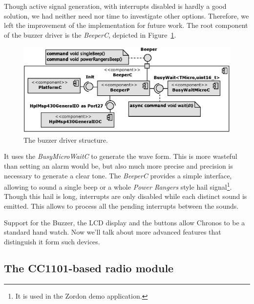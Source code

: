 Though active signal generation, with interrupts disabled is hardly a good solution, we had neither need nor time to investigate other options. Therefore, we left the improvement of the implementation for future work. The root component of the buzzer driver is the \emph{BeeperC}, depicted in Figure~\ref{fig:buzzer_c}.
\begin{figure}[h]
  \centering
  \includegraphics{diagrams/buzzer_c.eps}
  \caption{The buzzer driver structure.}
  \label{fig:buzzer_c}
\end{figure}
It uses the \emph{BusyMicroWaitC} to generate the wave form. This is more wasteful than setting an alarm would be, but also much more precise and precision is necessary to generate a clear tone. The \emph{BeeperC} provides a simple interface, allowing to sound a single beep or a whole \emph{Power Rangers} style hail signal\footnote{It is used in the Zordon demo application.}. Though this hail is long, interrupts are only disabled while each distinct sound is emitted. This allows to process all the pending interrupts between the sounds.

Support for the Buzzer, the LCD display and the buttons allow Chronos to be a standard hand watch. Now we'll talk about more advanced features that distinguish it form such devices.


\subsection{The CC1101-based radio module}

